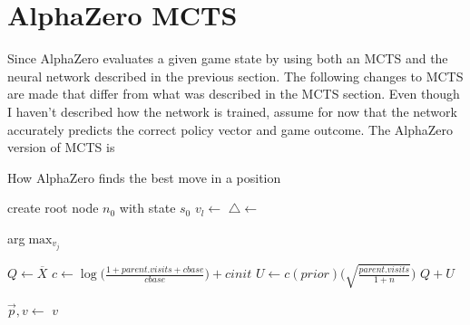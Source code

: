 \documentclass[letterpaper]{article} %
\begin{document}
  \section{AlphaZero MCTS}
  Since AlphaZero evaluates a given game state by using both an MCTS and the
  neural network described in the previous section. The following changes to
  MCTS are made that differ from what was described in the MCTS section. Even
  though I haven't described how the network is trained, assume for now that
  the network accurately predicts the correct policy vector and game outcome.
  The AlphaZero version of MCTS is
  \begin{algorithm}
  \caption{How AlphaZero finds the best move in a position}
  \begin{algorithmic}[1]

    \State create root node $n_0$ with state $s_0$
      \State $v_l \gets $
      \State $\triangle \gets$ 
      \State {}
    \EndWhile
    \State \Return {}
  \EndFunction
  \end{algorithmic}

  \begin{algorithmic}[1]
    \State \Return arg$\max_{v_j}$
  \EndFunction
  \end{algorithmic}

  \begin{algorithmic}[1]
    \State $Q \gets \overline{X}$ 
    \State $c \gets \log{\big(\frac{1+parent.visits+cbase}{cbase}\big)} + cinit$
    \State $U \gets c(prior)\big(\sqrt{\frac{parent.visits}{{1+n}}}\big)$
    \State \Return $Q+U$
  \EndFunction
  \end{algorithmic}

  \begin{algorithmic}[1]
    \State $\vec{p}, v \gets $
    \State \Return $v$
  \EndFunction
  \end{algorithmic}
  \end{algorithm}
\end{document}
